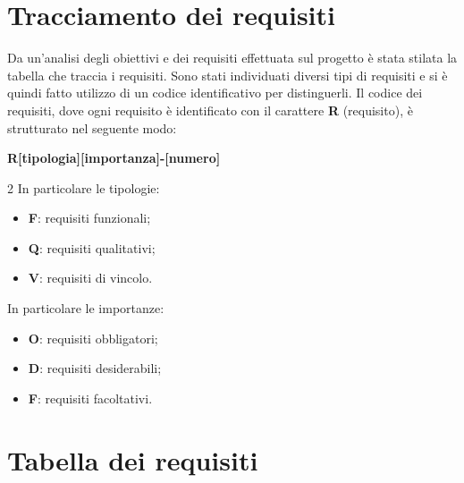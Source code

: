 \section{Tracciamento dei requisiti}
Da un'analisi degli obiettivi e dei requisiti effettuata sul progetto è stata stilata la tabella che traccia i requisiti.
Sono stati individuati diversi tipi di requisiti e si è quindi fatto utilizzo di un codice identificativo per distinguerli.
Il codice dei requisiti, dove ogni requisito è identificato con il carattere \textbf{R} (requisito), è strutturato nel seguente modo: 
\begin{center}
    \textbf{R[tipologia][importanza]-[numero]}
\end{center}
\begin{multicols}{2}
    \noindent
    In particolare le tipologie:
    \begin{itemize}
        \item \textbf{F}: requisiti funzionali;
        \item \textbf{Q}: requisiti qualitativi;
        \item \textbf{V}: requisiti di vincolo.
    \end{itemize}
    \columnbreak
    In particolare le importanze:
    \begin{itemize}
        \item \textbf{O}: requisiti obbligatori;
        \item \textbf{D}: requisiti desiderabili;
        \item \textbf{F}: requisiti facoltativi.
    \end{itemize}
\end{multicols}


\newpage
\section{Tabella dei requisiti}


